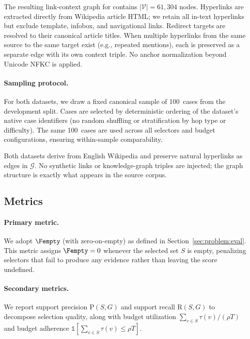 The resulting link-context graph for \IIRC contains $|\mathcal{V}| = 61{,}304$ nodes.
Hyperlinks are extracted directly from Wikipedia article HTML; we retain all in-text hyperlinks but exclude template, infobox, and navigational links. Redirect targets are resolved to their canonical article titles. When multiple hyperlinks from the same source to the same target exist (e.g., repeated mentions), each is preserved as a separate edge with its own context triple. No anchor normalization beyond Unicode NFKC is applied.

\paragraph{Sampling protocol.}
For both datasets, we draw a fixed canonical sample of 100~cases from the development split.
Cases are selected by deterministic ordering of the dataset's native case identifiers
(no random shuffling or stratification by hop type or difficulty).
The same 100~cases are used across all selectors and budget configurations,
ensuring within-sample comparability.

Both datasets derive from English Wikipedia and preserve natural hyperlinks
as edges in $\mathcal{G}$.
No synthetic links or knowledge-graph triples are injected; the graph
structure is exactly what appears in the source corpus.

\subsection{Metrics}
\label{sec:setup:metrics}

\paragraph{Primary metric.}
We adopt $\Fempty$ (\supportf with zero-on-empty) as defined
in Section~\ref{sec:problem:eval}.
This metric assigns $\Fempty = 0$ whenever the selected set $S$ is empty,
penalizing selectors that fail to produce any evidence rather than leaving
the score undefined.

\paragraph{Secondary metrics.}
We report support precision $\mathrm{P}(S, G)$ and support recall
$\mathrm{R}(S, G)$ to decompose selection quality, along with budget
utilization $\sum_{v \in S}\tau(v) / (\rho T)$ and budget adherence
$\mathbb{1}[\sum_{v \in S}\tau(v) \leq \rho T]$.

